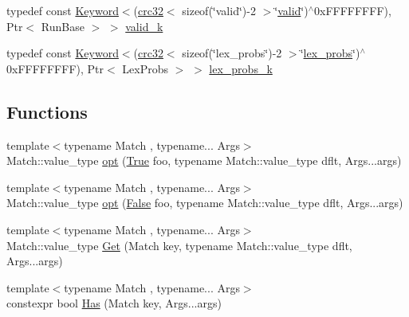 \begin{DoxyCompactItemize}
\item 
typedef const \hyperlink{classmarian_1_1keywords_1_1Keyword}{Keyword}$<$(\hyperlink{compile__time__crc32_8h_afb8250edaa6a10de4050142c2361fbce}{crc32}$<$ sizeof(\char`\"{}valid\char`\"{})-\/2 $>$\char`\"{}\hyperlink{namespacemarian_1_1keywords_a954e890640810041c811c50d386e918a}{valid}\char`\"{})$^\wedge$0x\+F\+F\+F\+F\+F\+F\+F\+F), Ptr$<$ Run\+Base $>$ $>$ \hyperlink{namespacemarian_1_1keywords_a330887765a1db7226363fd20201d8322}{valid\+\_\+k}
\item 
typedef const \hyperlink{classmarian_1_1keywords_1_1Keyword}{Keyword}$<$(\hyperlink{compile__time__crc32_8h_afb8250edaa6a10de4050142c2361fbce}{crc32}$<$ sizeof(\char`\"{}lex\+\_\+probs\char`\"{})-\/2 $>$\char`\"{}\hyperlink{namespacemarian_1_1keywords_a6cd9f87e937485444e78cd8e8126e727}{lex\+\_\+probs}\char`\"{})$^\wedge$0x\+F\+F\+F\+F\+F\+F\+F\+F), Ptr$<$ Lex\+Probs $>$ $>$ \hyperlink{namespacemarian_1_1keywords_a54f72752fae434951210362068ef4317}{lex\+\_\+probs\+\_\+k}
\end{DoxyCompactItemize}
\subsection*{Functions}
\begin{DoxyCompactItemize}
\item 
{\footnotesize template$<$typename Match , typename... Args$>$ }\\Match\+::value\+\_\+type \hyperlink{namespacemarian_1_1keywords_a31f73834fdcad7442a99340b90e54910}{opt} (\hyperlink{namespacemarian_1_1keywords_d5/d52/structmarian_1_1keywords_1_1True}{True} foo, typename Match\+::value\+\_\+type dflt, Args...\+args)
\item 
{\footnotesize template$<$typename Match , typename... Args$>$ }\\Match\+::value\+\_\+type \hyperlink{namespacemarian_1_1keywords_a7887ad1efa29ed5933f8e10feed309a7}{opt} (\hyperlink{namespacemarian_1_1keywords_d3/d3c/structmarian_1_1keywords_1_1False}{False} foo, typename Match\+::value\+\_\+type dflt, Args...\+args)
\item 
{\footnotesize template$<$typename Match , typename... Args$>$ }\\Match\+::value\+\_\+type \hyperlink{namespacemarian_1_1keywords_a74d7a2502faafdd421ef3dff629e284f}{Get} (Match key, typename Match\+::value\+\_\+type dflt, Args...\+args)
\item 
{\footnotesize template$<$typename Match , typename... Args$>$ }\\constexpr bool \hyperlink{namespacemarian_1_1keywords_a52724b0b4282d0607c0670f426eba62c}{Has} (Match key, Args...\+args)
\end{DoxyCompactItemize}
